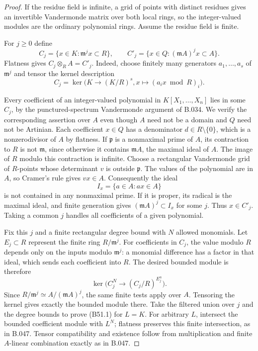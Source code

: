 \begin{proof}
If the residue field is infinite, a grid of points with
distinct residues gives an invertible Vandermonde
matrix over both local rings, so the integer-valued
modules are the ordinary polynomial rings. Assume
the residue field is finite.

For $j\ge0$ define
\[
 C_j=\{x\in K:\mathfrak m^jx\subset R\},\qquad
 C'_j=\{x\in Q:(\mathfrak m A)^jx\subset A\}.
\]
Flatness gives $C_j\otimes_R A=C'_j$.
Indeed, choose finitely many generators $a_1,\ldots,a_s$
of $\mathfrak m^j$ and tensor the kernel description
\[
 C_j=\ker\bigl(K\longrightarrow(K/R)^s,
                       x\longmapsto(a_ix\bmod R)_i\bigr).
\]

Every coefficient of an integer-valued polynomial in
$K[X_1,\ldots,X_n]$ lies in some $C_j$, by the
punctured-spectrum Vandermonde argument of B.034.
We verify the corresponding assertion over $A$ even
though $A$ need not be a domain and $Q$ need not be
Artinian. Each coefficient $x\in Q$ has a denominator
$d\in R\setminus\{0\}$, which is a nonzerodivisor
of $A$ by flatness. If $\mathfrak p$ is a nonmaximal
prime of $A$, its contraction to $R$ is not
$\mathfrak m$, since otherwise it contains
$\mathfrak m A$, the maximal ideal of $A$.
The image of $R$ modulo this contraction is infinite.
Choose a rectangular Vandermonde grid of $R$-points
whose determinant $v$ is outside $\mathfrak p$.
The values of the polynomial are in $A$, so Cramer's
rule gives $vx\in A$. Consequently the ideal
\[
                         I_x=\{a\in A:ax\in A\}
\]
is not contained in any nonmaximal prime. If it is
proper, its radical is the maximal ideal, and finite
generation gives $(\mathfrak m A)^j\subset I_x$
for some $j$. Thus $x\in C'_j$.
Taking a common $j$ handles all coefficients of a
given polynomial.

Fix this $j$ and a finite rectangular degree bound
with $N$ allowed monomials. Let $E_j\subset R$
represent the finite ring $R/\mathfrak m^j$.
For coefficients in $C_j$, the value modulo $R$
depends only on the inputs modulo $\mathfrak m^j$:
a monomial difference has a factor in that ideal,
which sends each coefficient into $R$.
The desired bounded module is therefore
\[
 \ker\bigl(C_j^N\longrightarrow(C_j/R)^{E_j^n}\bigr).
\]
Since $R/\mathfrak m^j\simeq A/(\mathfrak m A)^j$,
the same finite tests apply over $A$. Tensoring the
kernel gives exactly the bounded module there.
Take the filtered union over $j$ and the degree
bounds to prove (B51.1) for $L=K$.
For arbitrary $L$, intersect the bounded coefficient
module with $L^N$; flatness preserves this finite
intersection, as in B.047. Tensor compatibility and
existence follow from multiplication and finite
$A$-linear combination exactly as in B.047.
\end{proof}

